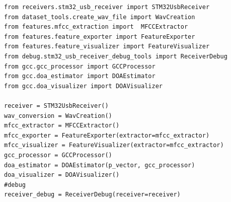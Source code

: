 \begin{lstlisting}[style=pythonstyle, caption={Initialization of the objects used in the main.py}, label={lst:init_main_py}]
from receivers.stm32_usb_receiver import STM32UsbReceiver
from dataset_tools.create_wav_file import WavCreation
from features.mfcc_extraction import  MFCCExtractor
from features.feature_exporter import FeatureExporter
from features.feature_visualizer import FeatureVisualizer
from debug.stm32_usb_receiver_debug_tools import ReceiverDebug
from gcc.gcc_processor import GCCProcessor
from gcc.doa_estimator import DOAEstimator
from gcc.doa_visualizer import DOAVisualizer

receiver = STM32UsbReceiver()
wav_conversion = WavCreation()
mfcc_extractor = MFCCExtractor()
mfcc_exporter = FeatureExporter(extractor=mfcc_extractor)
mfcc_visualizer = FeatureVisualizer(extractor=mfcc_extractor)
gcc_processor = GCCProcessor()
doa_estimator = DOAEstimator(p_vector, gcc_processor)
doa_visualizer = DOAVisualizer()
#debug 
receiver_debug = ReceiverDebug(receiver=receiver)
\end{lstlisting}


